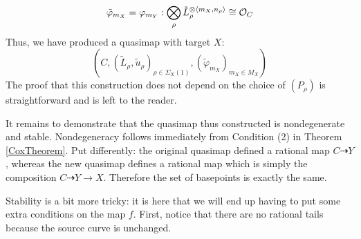 \begin{equation*} \tilde{\varphi}_{m_X} = \varphi_{m_Y} : \bigotimes_\rho \tilde{L}_\rho^{\otimes \langle m_X, n_\rho \rangle} \cong \mathcal{O}_C \end{equation*}
Thus, we have produced a quasimap with target $X$:
\begin{equation*} (C, (\tilde{L}_\rho, \tilde{u}_\rho)_{\rho \in \Sigma_X(1)}, (\tilde{\varphi}_{m_X})_{m_X \in M_X}) \end{equation*}
The proof that this construction does not depend on the choice of $(P_\rho)$ is straightforward and is left to the reader.

It remains to demonstrate that the quasimap thus constructed is nondegenerate and stable. Nondegeneracy follows immediately from Condition (2) in Theorem \ref{CoxTheorem}. Put differently: the original quasimap defined a rational map $C \dashrightarrow Y$, whereas the new quasimap defines a rational map which is simply the composition $C \dashrightarrow Y \to X$. Therefore the set of basepoints is exactly the same.

Stability is a bit more tricky: it is here that we will end up having to put some extra conditions on the map $f$. First, notice that there are no rational tails because the source curve is unchanged.

